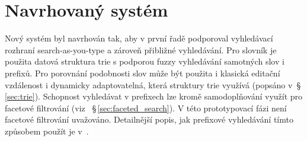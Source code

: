 \documentclass[11pt,letterpaper,oneside,openright]{book}
\begin{document}
%
%


\section{Navrhovaný systém}
Nový systém byl navrhován tak, aby v první řadě podporoval vyhledávací rozhraní
search-as-you-type a zároveň přibližné vyhledávání. Pro slovník je použita
datová struktura trie s podporou fuzzy vyhledávání samotných slov i prefixů.
Pro porovnání podobnosti slov může být použita i klasická editační vzdálenost i
dynamicky adaptovatelná, která struktury trie využívá (popsáno
v~\S\,\ref{sec:trie}). Schopnost vyhledávat v prefixech lze kromě
samodoplňování využít pro facetové filtrování (viz
~\S\,\ref{sec:faceted_search}). V této prototypovací fázi není facetové
filtrování uvažováno. Detailnější popis, jak prefixové vyhledávání tímto
způsobem použít je v~\cite{Bast_abstractwhen}.
\end{document}

